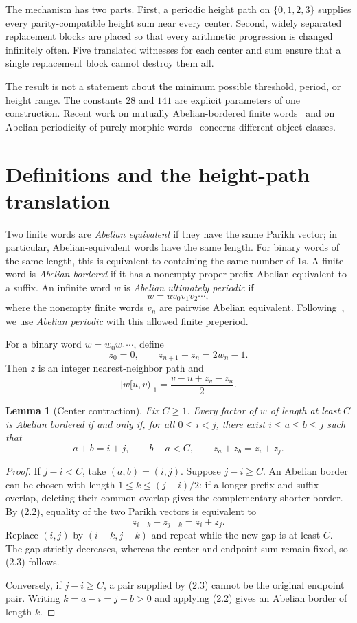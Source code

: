 \documentclass[11pt]{article}
\newtheorem{lemma}[theorem]{Lemma}
\begin{document}
The mechanism has two parts. First, a periodic height path on
$\{0,1,2,3\}$ supplies every parity-compatible height sum near every center.
Second, widely separated replacement blocks are placed so that every
arithmetic progression is changed infinitely often. Five translated
witnesses for each center and sum ensure that a single replacement block
cannot destroy them all.

The result is not a statement about the minimum possible threshold, period,
or height range. The constants $28$ and $141$ are explicit parameters of one
construction. Recent work on mutually Abelian-bordered finite
words~\cite{MaityKrishna} and on Abelian periodicity of purely morphic
words~\cite{FilimonovaPuzynina} concerns different object classes.

\section{Definitions and the height-path translation}

Two finite words are \emph{Abelian equivalent} if they have the same Parikh
vector; in particular, Abelian-equivalent words have the same length. For
binary words of the same length, this is equivalent to containing the same
number of $1$s. A finite word is \emph{Abelian bordered} if it has a nonempty
proper prefix Abelian equivalent to a suffix. An infinite word $w$ is
\emph{Abelian ultimately periodic} if
\[
w=u v_0v_1v_2\cdots,
\]
where the nonempty finite words $v_n$ are pairwise Abelian equivalent.
Following~\cite{CHPZ,FP}, we use \emph{Abelian periodic} with this allowed
finite preperiod.

For a binary word $w=w_0w_1\cdots$, define
\[
z_0=0,\qquad z_{n+1}-z_n=2w_n-1. \tag{2.1}
\]
Then $z$ is an integer nearest-neighbor path and
\[
|w[u,v)|_1=\frac{v-u+z_v-z_u}{2}. \tag{2.2}
\]

\begin{lemma}[Center contraction]\label{lem:center}
Fix $C\ge1$. Every factor of $w$ of length at least $C$ is Abelian bordered
if and only if, for all $0\le i<j$, there exist $i\le a\le b\le j$ such that
\[
a+b=i+j,\qquad b-a<C,\qquad z_a+z_b=z_i+z_j. \tag{2.3}
\]
\end{lemma}

\begin{proof}
If $j-i<C$, take $(a,b)=(i,j)$. Suppose $j-i\ge C$. An Abelian border can
be chosen with length $1\le k\le(j-i)/2$: if a longer prefix and suffix
overlap, deleting their common overlap gives the complementary shorter
border. By (2.2), equality of the two Parikh vectors is equivalent to
\[
z_{i+k}+z_{j-k}=z_i+z_j.
\]
Replace $(i,j)$ by $(i+k,j-k)$ and repeat while the new gap is at least $C$.
The gap strictly decreases, whereas the center and endpoint sum remain fixed,
so (2.3) follows.

Conversely, if $j-i\ge C$, a pair supplied by (2.3) cannot be the original
endpoint pair. Writing $k=a-i=j-b>0$ and applying (2.2) gives an Abelian
border of length $k$.
\end{proof}
\end{document}
